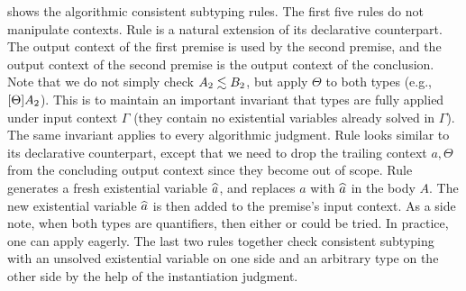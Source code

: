  shows the algorithmic consistent subtyping rules.
The first five rules do not manipulate contexts. %
Rule  is a natural extension of its declarative counterpart. The
output context of the first premise is used by the second premise, and the
output context of the second premise is the output context of the conclusion.
Note that we do not simply check $A_2 \lesssim B_2$, but apply $\Theta$
to both types (e.g., $[\Theta]A_2 $). This is
to maintain an important invariant that types
are fully applied
under input context $\Gamma$ (they contain no existential variables already solved in
$\Gamma$). The same invariant applies to every algorithmic judgment.
Rule  looks similar to its declarative counterpart, except that
we need to drop the trailing context $a, \Theta$ from the concluding output
context since they become out of scope.
Rule  generates a fresh
existential variable $\widehat{a}$, and replaces $a$ with $\widehat{a}$ in the body $A$. The
new existential variable $\widehat{a}$ is then added to the premise's input context.
As a side note, when both types are quantifiers, then either 
or  could be tried. In practice, one can apply
 eagerly.
The last two rules %
together check consistent subtyping with an
unsolved existential variable on one side and an arbitrary type on the other
side by the help of the instantiation judgment. %

